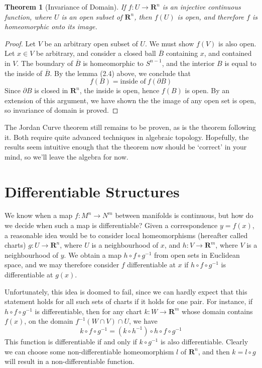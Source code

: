 \documentclass[12pt]{report}
\theoremstyle{plain}
\newtheorem{theorem}{Theorem}[chapter]
\theoremstyle{definition}
\begin{document}
\begin{theorem}[Invariance of Domain]
    If $f:U \to \mathbf{R}^n$ is an injective continuous function, where $U$ is an open subset of $\mathbf{R}^n$, then $f(U)$ is open, and therefore $f$ is homeomorphic onto its image.
\end{theorem}
\begin{proof}
    Let $V$ be an arbitrary open subset of $U$. We must show $f(V)$ is also open. Let $x \in V$ be arbitrary, and consider a closed ball $\overline{B}$ containing $x$, and contained in $V$. The boundary of $\overline{B}$ is homeomorphic to $S^{n-1}$, and the interior $B$ is equal to the inside of $\overline{B}$. By the lemma (2.4) above, we conclude that
    \[ f(B) = \text{inside of}\ f(\partial B) \]
    Since $\partial B$ is closed in $\mathbf{R}^n$, the inside is open, hence $f(B)$ is open. By an extension of this argument, we have shown the the image of any open set is open, so invariance of domain is proved.
\end{proof}

The Jordan Curve theorem still remains to be proven, as is the theorem following it. Both require quite advanced techniques in algebraic topology. Hopefully, the results seem intuitive enough that the theorem now should be `correct' in your mind, so we'll leave the algebra for now.










\chapter{Differentiable Structures}

We know when a map $f:M^n \to N^m$ between manifolds is continuous, but how do we decide when such a map is differentiable? Given a correspondence $y = f(x)$, a reasonable idea would be to consider local homeomorphisms (hereafter called charts) $g:U \to \mathbf{R}^n$, where $U$ is a neighbourhood of $x$, and $h:V \to \mathbf{R}^m$, where $V$ is a neighbourhood of $y$. We obtain a map $h \circ f \circ g^{-1}$ from open sets in Euclidean space, and we may therefore consider $f$ differentiable at $x$ if $h \circ f \circ g^{-1}$ is differentiable at $g(x)$.

Unfortunately, this idea is doomed to fail, since we can hardly expect that this statement holds for all such sets of charts if it holds for one pair. For instance, if $h \circ f \circ g^{-1}$ is differentiable, then for any chart $k:W \to \mathbf{R}^m$ whose domain contains $f(x)$, on the domain $f^{-1}(W \cap V)  \cap U$, we have
%
\[ k \circ f \circ g^{-1} = (k \circ h^{-1}) \circ h \circ f \circ g^{-1} \]
%
This function is differentiable if and only if $k \circ g^{-1}$ is also differentiable. Clearly we can choose some non-differentiable homeomorphism $l$ of $\mathbf{R}^n$, and then $k = l \circ g$ will result in a non-differentiable function.
\end{document}
